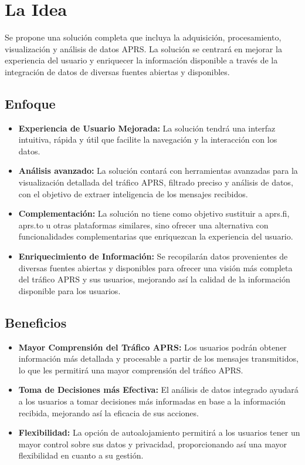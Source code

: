 \section{La Idea}
Se propone una solución completa que incluya la adquisición, procesamiento, visualización y análisis de datos APRS. La solución se centrará en mejorar la experiencia del usuario y enriquecer la información disponible a través de la integración de datos de diversas fuentes abiertas y disponibles.

\subsection{Enfoque}

\begin{itemize}
    \item \textbf{Experiencia de Usuario Mejorada:} La solución tendrá una interfaz intuitiva, rápida y útil que facilite la navegación y la interacción con los datos.
    
    \item \textbf{Análisis avanzado:} La solución contará con herramientas avanzadas para la visualización detallada del tráfico APRS, filtrado preciso y análisis de datos, con el objetivo de extraer inteligencia de los mensajes recibidos.
    
    \item \textbf{Complementación:} La solución no tiene como objetivo sustituir a aprs.fi, aprs.to u otras plataformas similares, sino ofrecer una alternativa con funcionalidades complementarias que enriquezcan la experiencia del usuario.
    
    \item \textbf{Enriquecimiento de Información:} Se recopilarán datos provenientes de diversas fuentes abiertas y disponibles para ofrecer una visión más completa del tráfico APRS y sus usuarios, mejorando así la calidad de la información disponible para los usuarios.
\end{itemize}

\subsection{Beneficios}

\begin{itemize}
    \item \textbf{Mayor Comprensión del Tráfico APRS:} Los usuarios podrán obtener información más detallada y procesable a partir de los mensajes transmitidos, lo que les permitirá una mayor comprensión del tráfico APRS.
    
	\item \textbf{Toma de Decisiones más Efectiva:} El análisis de datos integrado ayudará a los usuarios a tomar decisiones más informadas en base a la información recibida, mejorando así la eficacia de sus acciones.
    
    \item \textbf{Flexibilidad:} La opción de autoalojamiento permitirá a los usuarios tener un mayor control sobre sus datos y privacidad, proporcionando así una mayor flexibilidad en cuanto a su gestión.
\end{itemize}


